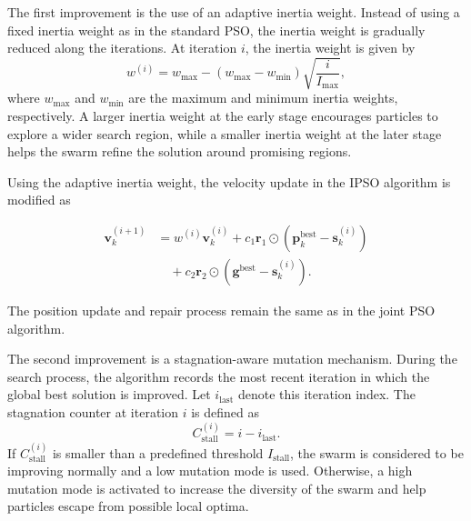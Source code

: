 \documentclass[conference]{IEEEtran}
\begin{document}
The first improvement is the use of an adaptive inertia weight. Instead of using a fixed inertia weight as in the standard PSO, the inertia weight is gradually reduced along the iterations. At iteration $i$, the inertia weight is given by
\begin{equation}
w^{(i)}
=
w_{\max}
-
\left(
w_{\max}
-
w_{\min}
\right)
\sqrt{
\frac{i}{I_{\max}}
},
\label{eq:adaptive_inertia}
\end{equation}
where $w_{\max}$ and $w_{\min}$ are the maximum and minimum inertia weights, respectively. A larger inertia weight at the early stage encourages particles to explore a wider search region, while a smaller inertia weight at the later stage helps the swarm refine the solution around promising regions.

Using the adaptive inertia weight, the velocity update in the IPSO algorithm is modified as

\begin{equation}
\begin{aligned}
\mathbf{v}_k^{(i+1)}
&=
w^{(i)}\mathbf{v}_k^{(i)}
+
c_1\mathbf{r}_1 \odot
\left(
\mathbf{p}_k^{\mathrm{best}}
-
\mathbf{s}_k^{(i)}
\right)
\\
&\quad
+
c_2\mathbf{r}_2 \odot
\left(
\mathbf{g}^{\mathrm{best}}
-
\mathbf{s}_k^{(i)}
\right).
\end{aligned}
\label{eq:ipso_velocity}
\end{equation}

The position update and repair process remain the same as in the joint PSO algorithm.

The second improvement is a stagnation-aware mutation mechanism. During the search process, the algorithm records the most recent iteration in which the global best solution is improved. Let $i_{\mathrm{last}}$ denote this iteration index. The stagnation counter at iteration $i$ is defined as
\begin{equation}
C_{\mathrm{stall}}^{(i)}
=
i - i_{\mathrm{last}}.
\label{eq:stall_counter}
\end{equation}
If $C_{\mathrm{stall}}^{(i)}$ is smaller than a predefined threshold $I_{\mathrm{stall}}$, the swarm is considered to be improving normally and a low mutation mode is used. Otherwise, a high mutation mode is activated to increase the diversity of the swarm and help particles escape from possible local optima.
\end{document}
